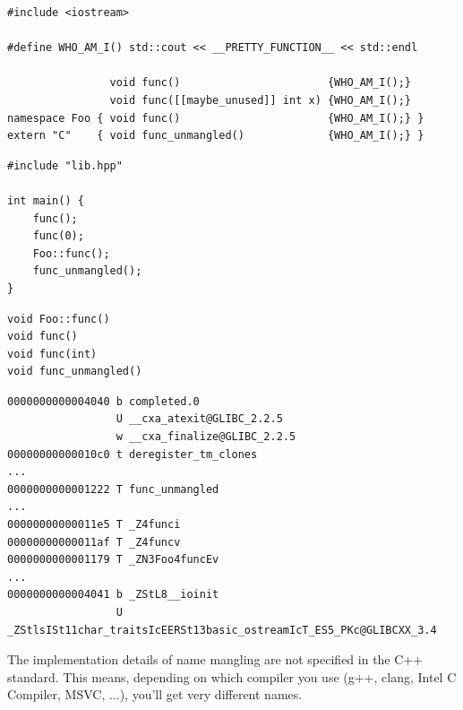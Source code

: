 \begin{frame}[fragile]
%
\begin{codebox}[C++ Library]
\begin{verbatim}
#include <iostream>

#define WHO_AM_I() std::cout << __PRETTY_FUNCTION__ << std::endl

                void func()                       {WHO_AM_I();}
                void func([[maybe_unused]] int x) {WHO_AM_I();}
namespace Foo { void func()                       {WHO_AM_I();} }
extern "C"    { void func_unmangled()             {WHO_AM_I();} }
\end{verbatim}
\end{codebox}
%
\begin{tcbraster}[raster columns=2,
                  raster equal height,
                  nobeforeafter,
                  raster column skip=0.2cm]
\begin{codebox}
\begin{verbatim}
#include "lib.hpp"

int main() {
    func();
    func(0);
    Foo::func();
    func_unmangled();
}
\end{verbatim}
\end{codebox}
%
\begin{cmdbox}[Output]
\begin{verbatim}
void Foo::func()
void func()
void func(int)
void func_unmangled()
\end{verbatim}
\end{cmdbox}
\end{tcbraster} 
%
\end{frame}


\begin{frame}[fragile]
%
\begin{cmdbox}
\begin{verbatim}
0000000000004040 b completed.0
                 U __cxa_atexit@GLIBC_2.2.5
                 w __cxa_finalize@GLIBC_2.2.5
00000000000010c0 t deregister_tm_clones
...
0000000000001222 T func_unmangled
...
00000000000011e5 T _Z4funci
00000000000011af T _Z4funcv
0000000000001179 T _ZN3Foo4funcEv
...
0000000000004041 b _ZStL8__ioinit
                 U _ZStlsISt11char_traitsIcEERSt13basic_ostreamIcT_ES5_PKc@GLIBCXX_3.4
\end{verbatim}
\end{cmdbox}
%
\begin{hintbox}
\footnotesize
The implementation details of name mangling are not specified in the C++ standard. This means, depending on which compiler you use (g++, clang, Intel C Compiler, MSVC, ...), you'll get very different names.
\end{hintbox}
%
\end{frame}

